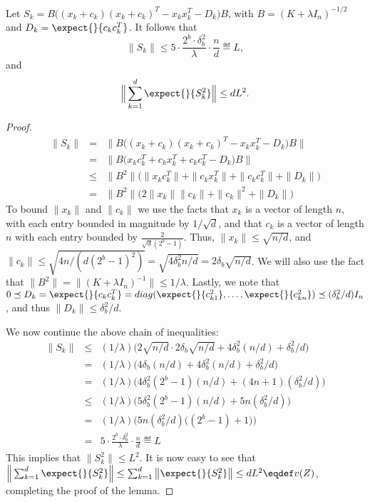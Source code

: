 \begin{lemma}
	\label{upper_bounds}
	Let $S_k = B\Big((x_k + c_k)(x_k + c_k)^T  - x_k x_k^T - D_k\Big)B$, with $B=(K+\lambda I_n)^{-1/2}$ and $D_k=\expect{}{c_k c_k^T}$.  It follows that
	$$\|S_k\| \leq 5 \cdot \frac{2^b \cdot \delta_b^2}{\lambda}\cdot  \frac{n}{d} \eqdef L,$$
	and
	$$\Big\|\sum_{k=1}^d \expect{}{S_k^2}\Big\| \leq dL^2.$$
\end{lemma}
\begin{proof}
\begin{eqnarray*}
\|S_k\| &=& \|B\Big((x_k + c_k)(x_k + c_k)^T  - x_k x_k^T - D_k\Big)B\| \\
&=& \|B\Big(x_kc_k^T + c_kx_k^T + c_k c_k^T - D_k\Big)B\| \\
&\leq& \|B^2\|\Big(\|x_kc_k^T\| + \|c_kx_k^T\| + \|c_k c_k^T\| + \|D_k\|\Big) \\
&=& \|B^2\|\Big(2\|x_k\|\|c_k\| + \|c_k\|^2 + \|D_k\|\Big) 
\end{eqnarray*}
To bound $\|x_k\|$ and $\|c_k\|$ we use the facts that $x_k$ is a vector of length $n$, with each entry bounded in magnitude by $1/\sqrt{d}$, and that $c_k$ is a vector of length $n$ with each entry bounded by $\frac{2}{\sqrt{d}(2^b-1)}$.  Thus, $\|x_k\| \leq \sqrt{n/d}$, and $\|c_k\| \leq \sqrt{4n/(d(2^b-1)^2)} = \sqrt{4\delta_b^2n/d} = 2\delta_b\sqrt{n/d}$.  We will also use the fact that $\|B^2\| = \|(K+\lambda I_n)^{-1}\| \leq 1/\lambda$.  Lastly, we note that $0 \preceq D_k = \expect{}{c_k c_k^T} = diag(\expect{}{c_{k1}^2},\ldots,\expect{}{c_{kn}^2}) \preceq (\delta_b^2/d) I_n$, and thus $\|D_k\| \leq \delta_b^2/d$.

We now continue the above chain of inequalities:
\begin{eqnarray*}
\|S_k\| &\leq& (1/\lambda)\Big(2\sqrt{n/d}\cdot 2\delta_b\sqrt{n/d} + 4\delta_b^2(n/d) + \delta_b^2/d\Big)\\
&=& (1/\lambda)\Big(4\delta_b(n/d) + 4\delta_b^2(n/d) + \delta_b^2/d\Big) \\
&=& (1/\lambda)\Big(4\delta_b^2(2^b-1)(n/d) + (4n + 1)(\delta_b^2/d)\Big) \\
&\leq& (1/\lambda)\Big(5\delta_b^2(2^b-1)(n/d) + 5n(\delta_b^2/d)\Big) \\
&=& (1/\lambda)\Big(5n(\delta_b^2/d)\Big((2^b-1)+1\Big)\Big) \\
&=& 5 \cdot \frac{2^b \cdot \delta_b^2}{\lambda}\cdot  \frac{n}{d} \eqdef L
\end{eqnarray*}
This implies that $\|S_k^2\| \leq L^2$.  It is now easy to see that 
$\Big\|\sum_{k=1}^d \expect{}{S_k^2}\Big\| \leq \sum_{k=1}^d \big\|\expect{}{S_k^2}\big\| \leq dL^2 \eqdef v(Z)$, completing the proof of the lemma.



\end{proof}
